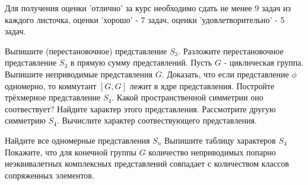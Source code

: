 \documentclass[12pt]{article}
\begin{document}

Для получения оценки 'отлично' за курс необходимо сдать не менее 9 задач из каждого листочка, оценки 'хорошо' - 7 задач, оценки 'удовлетворительно' - 5 задач. 

	\p
	Выпишите (перестановочное) представление $S_3$.
	\ep
	\p
	Разложите перестановочное представление $S_3$ в прямую сумму представлений.
	\ep
	\p 
	Пусть $G$ - циклическая группа. Выпишите неприводимые представления $G$.
	\ep
	\p 
	Доказать, что если представление $\phi$ одномерно, то коммутант $[G,G]$ лежит в ядре представления.
	\ep
	\p
	Постройте трёхмерное представление $S_4$. Какой пространственной симметрии оно соотвествует? Найдите характер этого представления.
	\ep
	\p Рассмотрите другую симметрию $S_4$. Вычислите характер соотвествующего представления.
	\ep

	
	\p Найдите все одномерные представления $S_n$
	\ep
	\p Выпишите таблицу характеров $S_4$
	\ep
	\p Покажите, что для конечной группы $G$ количество неприводимых попарно неэквивалетных комплексных представлений совпадает с количеством классов сопряженных элементов.	
	\ep


	
\end{document}
